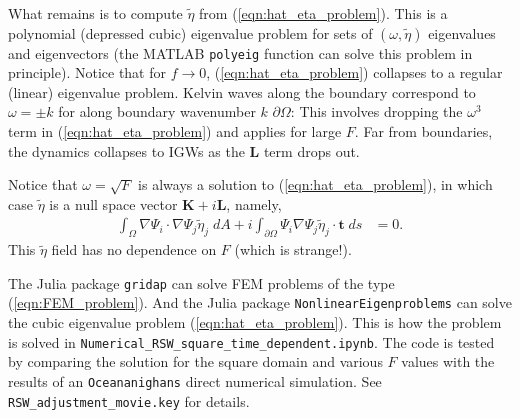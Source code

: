 \documentclass[10pt,reqno]{amsart}
\newcommand{\K}{{\mathbf K}}
\newcommand{\LL}{{\mathbf L}}
\newcommand{\ttt}{{\mathbf t}}
\begin{document}
What remains is to compute $\tilde{\eta}$ from (\ref{eqn:hat_eta_problem}).
This is a polynomial (depressed cubic) eigenvalue problem for sets of $(\omega, \tilde{\eta})$ eigenvalues and eigenvectors (the MATLAB \texttt{polyeig} function can solve this problem in principle).
Notice that for $f \rightarrow 0$, (\ref{eqn:hat_eta_problem}) collapses to a regular (linear) eigenvalue problem.
Kelvin waves along the boundary correspond to $\omega = \pm k$ for along boundary wavenumber $k$ $\partial \Omega$: This involves dropping the $\omega^3$ term in (\ref{eqn:hat_eta_problem}) and applies for large $F$.
Far from boundaries, the dynamics collapses to IGWs as the $\LL$ term drops out.

Notice that $\omega = \sqrt{F}$ is always a solution to (\ref{eqn:hat_eta_problem}), in which case $\tilde{\eta}$ is a null space vector $ \K + i  \LL$, namely,
\begin{align}
 \int_\Omega  \nabla \Psi_i \cdot   \nabla \Psi_j  \tilde{\eta}_j \; d A + i  \int_ {\partial \Omega}  \Psi_i \nabla \Psi_j \tilde{\eta}_j \cdot \ttt \; d s & = 0 .
\end{align}
This $\tilde{\eta}$ field has no dependence on $F$ (which is strange!).

The Julia package \texttt{gridap} can solve FEM problems of the type (\ref{eqn:FEM_problem}). 
And the Julia package \texttt{NonlinearEigenproblems} can solve the cubic eigenvalue problem (\ref{eqn:hat_eta_problem}).
This is how the problem is solved in \texttt{Numerical\_RSW\_square\_time\_dependent.ipynb}.
The code is tested by comparing the solution for the square domain and various $F$ values with the results of an \texttt{Oceananighans} direct numerical simulation.
See \texttt{RSW\_adjustment\_movie.key} for details.




\end{document}
